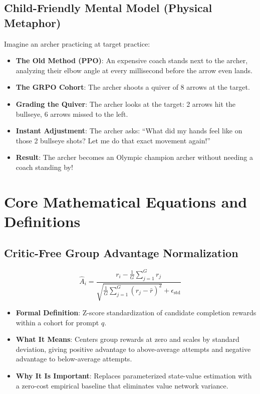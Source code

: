 \documentclass[11pt,a4paper]{article}
\theoremstyle{definition}
\begin{document}
\subsection{Child-Friendly Mental Model (Physical Metaphor)}
Imagine an archer practicing at target practice:
\begin{itemize}
    \item \textbf{The Old Method (PPO)}: An expensive coach stands next to the archer, analyzing their elbow angle at every millisecond before the arrow even lands.
    \item \textbf{The GRPO Cohort}: The archer shoots a quiver of 8 arrows at the target.
    \item \textbf{Grading the Quiver}: The archer looks at the target: 2 arrows hit the bullseye, 6 arrows missed to the left.
    \item \textbf{Instant Adjustment}: The archer asks: ``What did my hands feel like on those 2 bullseye shots? Let me do that exact movement again!''
    \item \textbf{Result}: The archer becomes an Olympic champion archer without needing a coach standing by!
\end{itemize}

\section{Core Mathematical Equations and Definitions}

\subsection{Critic-Free Group Advantage Normalization}
{\boldmath
\begin{equation}
\hat{A}_i = \frac{r_i - \frac{1}{G}\sum_{j=1}^G r_j}{\sqrt{\frac{1}{G}\sum_{j=1}^G \left(r_j - \bar{r}\right)^2} + \epsilon_{\text{std}}}
\end{equation}
}
\begin{itemize}
    \item \textbf{Formal Definition}: Z-score standardization of candidate completion rewards within a cohort for prompt $q$.
    \item \textbf{What It Means}: Centers group rewards at zero and scales by standard deviation, giving positive advantage to above-average attempts and negative advantage to below-average attempts.
    \item \textbf{Why It Is Important}: Replaces parameterized state-value estimation with a zero-cost empirical baseline that eliminates value network variance.
\end{itemize}
\end{document}
